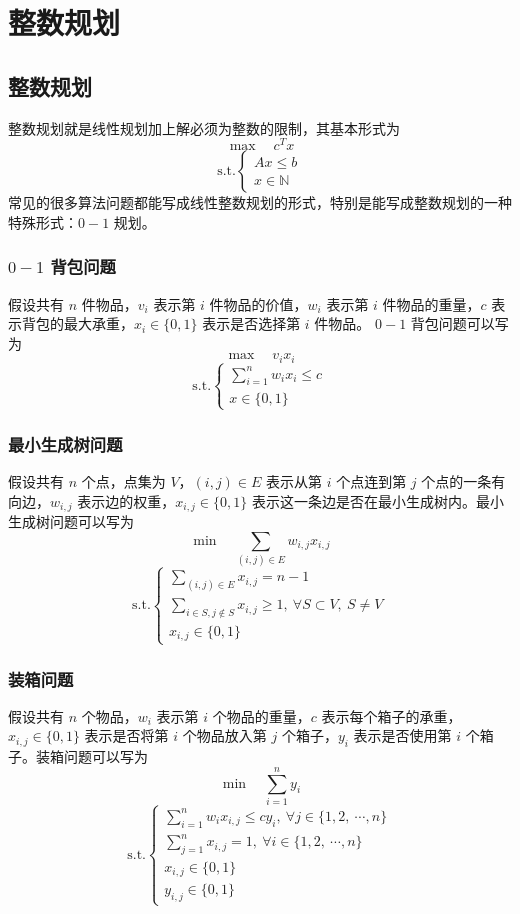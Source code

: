 \section{整数规划}
\subsection{整数规划}
整数规划就是线性规划加上解必须为整数的限制，其基本形式为
$$
\max \quad c^Tx
$$
$$
\text{s.t.} 
\begin{cases}
    Ax \le b \\
    x \in \mathbb{N}
\end{cases}
$$
常见的很多算法问题都能写成线性整数规划的形式，特别是能写成整数规划的一种特殊形式：$0 - 1$ 规划。

\subsubsection{$0 - 1$ 背包问题}
假设共有 $n$ 件物品，$v_i$ 表示第 $i$ 件物品的价值，$w_i$ 表示第 $i$ 件物品的重量，$c$ 表示背包的最大承重，$x_i \in \{0, 1\}$ 表示是否选择第 $i$ 件物品。 $0-1$ 背包问题可以写为
$$
\max \quad v_ix_i
$$
$$
\text{s.t.} 
\begin{cases}
    \sum_{i = 1}^n w_ix_i \le c \\
    x \in \{0, 1\}
\end{cases}
$$

\subsubsection{最小生成树问题}
假设共有 $n$ 个点，点集为 $V$，$(i, j) \in E$ 表示从第 $i$ 个点连到第 $j$ 个点的一条有向边，$w_{i, j}$ 表示边的权重，$x_{i, j} \in \{0, 1\}$ 表示这一条边是否在最小生成树内。最小生成树问题可以写为 \\
$$
\min \quad \sum_{(i, j) \in E} w_{i, j}x_{i, j}
$$
$$
\text{s.t.} 
\begin{cases}
    \sum_{(i, j) \in E} x_{i, j} = n - 1 \\
    \sum_{i \in S, j \notin S} x_{i, j} \ge 1, \ \forall S \subset V, \ S \ne V\\
    x_{i, j} \in \{0, 1\}
\end{cases}
$$

\subsubsection{装箱问题}
假设共有 $n$ 个物品，$w_i$ 表示第 $i$ 个物品的重量，$c$ 表示每个箱子的承重，$x_{i, j} \in \{0, 1\}$ 表示是否将第 $i$ 个物品放入第 $j$ 个箱子，$y_i$ 表示是否使用第 $i$ 个箱子。装箱问题可以写为
$$
\min \quad \sum_{i = 1}^n y_i
$$
$$
\text{s.t.} 
\begin{cases}
    \sum_{i = 1}^n w_ix_{i, j} \le cy_i, \ \forall j \in \{1, 2, \ \cdots, n\} \\
    \sum_{j = 1}^n x_{i, j} = 1, \ \forall i \in \{1, 2, \ \cdots, n\} \\
    x_{i, j} \in \{0, 1\} \\
    y_{i, j} \in \{0, 1\} 
\end{cases}
$$

